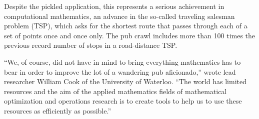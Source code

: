 \documentclass[landscape,a0paper,fontscale=0.28]{baposter} %
\newcommand{\tab}{\hspace{0.8cm}}
\begin{document}
\begin{poster}
{\begin{multicols}{2}
\tab Despite the pickled application, this represents a serious achievement in computational mathematics, an advance in the so-called traveling salesman problem (TSP), which asks for the shortest route that passes through each of a set of points once and once only. The pub crawl includes more than 100 times the previous record number of stops in a road-distance TSP.

\tab ``We, of course, did not have in mind to bring everything mathematics has to bear in order to improve the lot of a wandering pub aficionado,'' wrote lead researcher William Cook of the University of Waterloo. ``The world has limited resources and the aim of the applied mathematics fields of mathematical optimization and operations research is to create tools to help us to use these resources as efficiently as possible.''
\end{multicols}
}




\end{poster}
\end{document}
